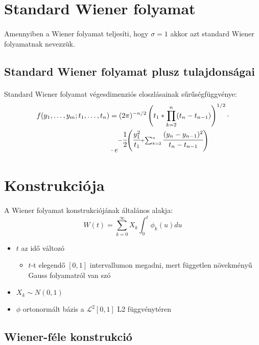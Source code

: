 \documentclass[11pt,a4pape,draftr]{article}
\begin{document}
			\section{Standard Wiener folyamat}
				\paragraph{}
					Amennyiben a Wiener folyamat teljesíti, hogy $\sigma = 1$ akkor azt standard Wiener folyamatnak nevezzük.
			\subsection{Standard Wiener folyamat plusz tulajdonságai}
				\paragraph{}
					Standard Wiener folyamat végesdimenziós eloszlásainak sűrűségfüggvénye:
					$$\begin{aligned}
						f(y_1, \dots, y_m; t_1, \dots , t_n) &= (2\pi)^{-n/2}\left(t_1*\prod_{k=2}^n(t_n-t_{n-1}) \right)^{1/2} \cdot \\
						&\cdot e^{-\cfrac{1}{2} \left( \cfrac{y_1^2}{t_1}+\sum_{k=2}^n \cfrac{(y_n-y_{n-1})^2}{t_n - t_{n-1}} \right)}
					\end{aligned}$$
			\section[Wiener-folyamat konstrukciója]{Konstrukciója}
				\paragraph{}
					A Wiener folyamat konstrukciójának általános alakja:
					$$W(t) = \sum_{k=0}^{\infty}X_k \int_0^t \phi_k (u) du$$
					\begin{itemize}
						\item $t$ az idő változó
						\begin{itemize}
							\item $t$-t elegendő $[0,1]$ intervallumon megadni, mert független növekményű Gauss folyamatról van szó
						\end{itemize}
						\item $X_k \sim N(0,1)$
						\item $\phi$ ortonormált bázis a $\mathcal{L}^2[0,1]$ L2 függvénytéren
					\end{itemize}
				\subsection{Wiener-féle konstrukció}
\end{document}
